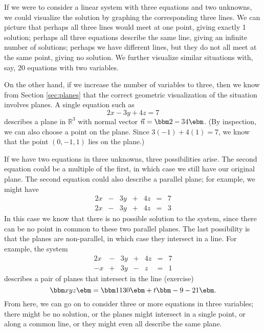 If we were to consider a linear system with three equations and two unknowns, we could visualize the solution by graphing the corresponding three lines. We can picture that perhaps all three lines would meet at one point, giving exactly 1 solution; perhaps all three equations describe the same line, giving an infinite number of solutions; perhaps we have different lines, but they do not all meet at the same point, giving no solution. We further visualize similar situations with, say, 20 equations with two variables.

On the other hand, if we increase the number of variables to three, then we know from Section \ref{sec:planes} that the correct geometric visualization of the situation involves planes. A single equation such as
\[
2x-3y+4z=7
\]
describes a plane in $\mathbb{R}^3$ with normal vector $\vec n = \bbm 2\\-3\\4\ebm$. (By inspection, we can also choose a point on the plane. Since $3(-1)+4(1)=7$, we know that the point $(0,-1,1)$ lies on the plane.)

If we have two equations in three unknowns, three possibilities arise. The second equation could be a multiple of the first, in which case we still have our original plane. The second equation could also describe a parallel plane; for example, we might have
\[
\begin{array}{ccccccc}
2x&-&3y&+&4z&=&7\\
2x&-&3y&+&4z&=&3
\end{array}
\]
In this case we know that there is no possible solution to the system, since there can be no point in common to these two parallel planes. The last possibility is that the planes are non-parallel, in which case they intersect in a line. For example, the system
\[
\begin{array}{ccccccc}
2x&-&3y&+&4z&=&7\\
-x&+&3y&-&z&=&1
\end{array}
\]
describes a pair of planes that intersect in the line (exercise)
\[
\bbm x\\y\\z\ebm = \bbm 11\\3\\0\ebm + t\bbm -9\\-2\\1\ebm.
\]
From here, we can go on to consider three or more equations in three variables; there might be no solution, or the planes might intersect in a single point, or along a common line, or they might even all describe the same plane.

